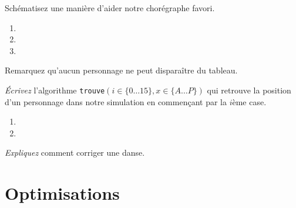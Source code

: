 \begin{exo}
Schématisez une manière d'aider notre chorégraphe favori.
\begin{enumerate}
\item {}
\item {}
\item {}
\end{enumerate}
\end{exo}

Remarquez qu'aucun personnage ne peut disparaître du tableau.
\begin{exo}
\emph{Écrivez} l'algorithme
\texttt{trouve}$(i\in\{0\dots15\}, x\in\{A\dots P\})$ qui retrouve la position
d'un personnage dans notre simulation en commençant par la $i$ème case.
\begin{enumerate}
\item {}
	\dotfill
\item {}
	\dotfill
\end{enumerate}
\end{exo}
\begin{exo}[Préparation]
	\emph{Expliquez} comment corriger une danse. 
\end{exo}

\section{Optimisations}
\begin{comment}
Grâce à vous, Noël se passera bien pour notre ami.
Il nous doit une \emph{reconnaissance éternelle}
mais il a encore un <<~petit quelque chose~>> à nous demander.

Il a entendu dire que
Sa~Majesté se lassait de tout ça et qu'elle avait décidé de changer les règles :
pendant le prochain milliard d'années (ils vivent tous très longtemps mais la
principale cause de mortalité est la décapitation), l'Élu
(qu'Elle essaiera de ne pas exécuter entre-temps, Elle fera un effort)
participera à sa place et ils reprendront du même endroit l'année suivante.
La danse ne changera pas (quel intérêt si Elle ne regarde pas ?).
Le chorégraphe doit maintenant prédire la position exacte des danseurs après
tout ce temps. S'il se trompe, il sera exécuté, lui et toute sa famille.
\end{comment}

